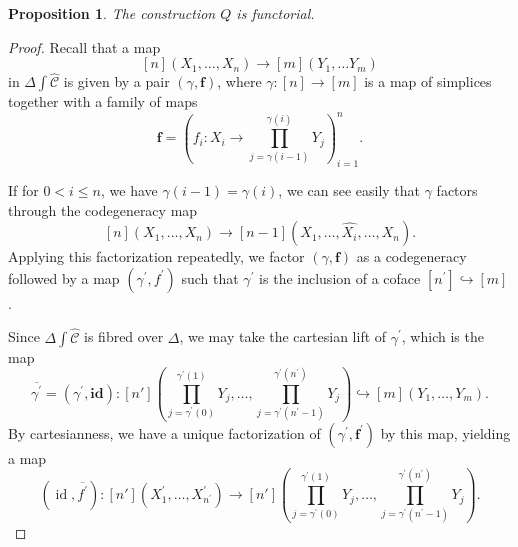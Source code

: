 \documentclass[leqno]{article}
\numberwithin{equation}{subsection}
\theoremstyle{plain}   %
\newtheorem{prop}[equation]{Proposition}
\theoremstyle{remark}
\theoremstyle{plain}
\DeclareMathOperator{\id}{id}
\newcommand{\psh}[1]{\ensuremath{\widehat{#1}}}
\newcommand{\C}{\ensuremath{\mathcal{C}}}
\begin{document}
\begin{prop} The construction \(Q\) is functorial.
\end{prop}
\begin{proof}
	Recall that a map \[[n](X_1,\dots, X_n) \to [m](Y_1,\dots Y_m)\] in \(\Delta \int \psh{\C}\) is given by a pair \((\gamma,\mathbf{f})\), where \(\gamma:[n]\to [m]\) is a map of simplices together with a family of maps \[\mathbf{f}=\left(f_i: X_i \to \prod_{j=\gamma(i-1)}^{\gamma(i)}Y_j\right)_{i=1}^n.\]

	If for \(0<i\leq n\), we have \(\gamma(i-1)=\gamma(i)\), we can see easily that \(\gamma\) factors through the codegeneracy map \[[n](X_1,\dots,X_n)\to [n-1](X_1,\dots,\psh{X_i},\dots,X_n).\]  Applying this factorization repeatedly, we factor \((\gamma,\mathbf{f})\) as a codegeneracy followed by a map \((\gamma^\prime,f^\prime)\) such that \(\gamma^\prime\) is the inclusion of a coface \([n^\prime]\hookrightarrow [m]\).

	Since \(\Delta\int \psh{\C}\) is fibred over \(\Delta\), we may take the cartesian lift of \(\gamma^\prime\), which is the map \[\overline{\gamma^\prime}=(\gamma^\prime,\mathbf{id}):[n']\left(\prod_{j=\gamma^\prime(0)}^{\gamma^\prime(1)}Y_j, \dots, \prod_{j=\gamma^\prime(n^\prime-1)}^{\gamma^\prime(n^\prime)} Y_j \right)\hookrightarrow [m](Y_1,\dots,Y_m).\]  By cartesianness, we have a unique factorization of \((\gamma^\prime,\mathbf{f^\prime})\) by this map, yielding a map \[(\id,\overline{f^\prime}):[n'](X^\prime_1,\dots,X^\prime_{n^\prime})\to [n']\left(\prod_{j=\gamma^\prime(0)}^{\gamma^\prime(1)}Y_j, \dots, \prod_{j=\gamma^\prime(n^\prime-1)}^{\gamma^\prime(n^\prime)} Y_j \right).\]


\end{proof}
\end{document}
